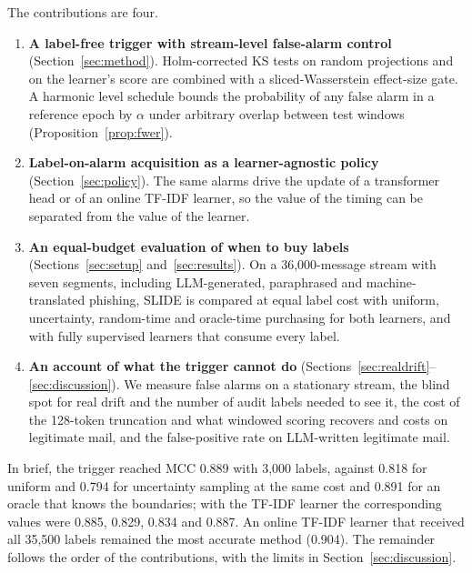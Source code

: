 The contributions are four.
\begin{enumerate}
\item \textbf{A label-free trigger with stream-level false-alarm control} (Section~\ref{sec:method}). Holm-corrected KS tests on random projections and on the learner's score are combined with a sliced-Wasserstein effect-size gate. A harmonic level schedule bounds the probability of any false alarm in a reference epoch by $\alpha$ under arbitrary overlap between test windows (Proposition~\ref{prop:fwer}).
\item \textbf{Label-on-alarm acquisition as a learner-agnostic policy} (Section~\ref{sec:policy}). The same alarms drive the update of a transformer head or of an online TF-IDF learner, so the value of the timing can be separated from the value of the learner.
\item \textbf{An equal-budget evaluation of when to buy labels} (Sections~\ref{sec:setup} and~\ref{sec:results}). On a 36{,}000-message stream with seven segments, including LLM-generated, paraphrased and machine-translated phishing, SLIDE is compared at equal label cost with uniform, uncertainty, random-time and oracle-time purchasing for both learners, and with fully supervised learners that consume every label.
\item \textbf{An account of what the trigger cannot do} (Sections~\ref{sec:realdrift}--\ref{sec:discussion}). We measure false alarms on a stationary stream, the blind spot for real drift and the number of audit labels needed to see it, the cost of the 128-token truncation and what windowed scoring recovers and costs on legitimate mail, and the false-positive rate on LLM-written legitimate mail.
\end{enumerate}

In brief, the trigger reached MCC 0.889 with 3{,}000 labels, against 0.818 for uniform and 0.794 for uncertainty sampling at the same cost and 0.891 for an oracle that knows the boundaries; with the TF-IDF learner the corresponding values were 0.885, 0.829, 0.834 and 0.887. An online TF-IDF learner that received all 35{,}500 labels remained the most accurate method (0.904). The remainder follows the order of the contributions, with the limits in Section~\ref{sec:discussion}.
